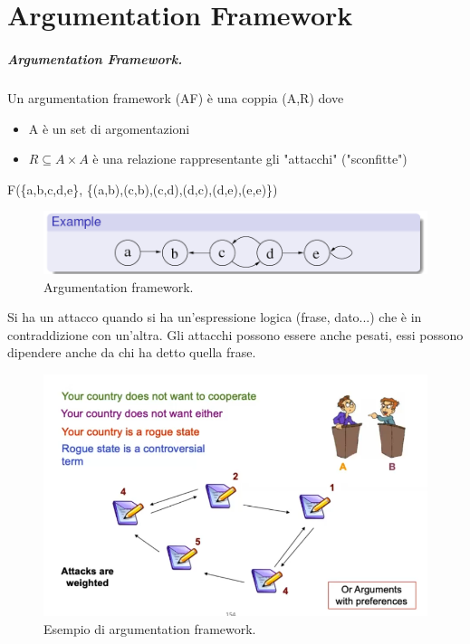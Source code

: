\chapter{Argumentation Framework}
\paragraph{Argumentation Framework.}Un argumentation framework (AF) è una coppia (A,R) dove 
\begin{itemize}
    \item A è un set di argomentazioni 
    \item $R \subseteq  A\times  A$ è una relazione rappresentante gli "attacchi" ("sconfitte")
\end{itemize}

\begin{center}
    F(\{a,b,c,d,e\}, \{(a,b),(c,b),(c,d),(d,c),(d,e),(e,e)\})
\end{center}
\begin{figure}[H]
    \centering
    \includegraphics[width=12cm, keepaspectratio]{img/arg_fram.png}
    \caption{Argumentation framework.}\label{fig:arg_fram}
\end{figure}
Si ha un attacco quando si ha un'espressione logica (frase, dato...) che è in contraddizione con un'altra. Gli attacchi possono essere anche pesati, essi possono dipendere anche da chi ha detto quella frase.
\begin{figure}[H]
    \centering
    \includegraphics[width=12cm, keepaspectratio]{img/es_arg_fram.png}
    \caption{Esempio di argumentation framework.}\label{fig:es_arg_fram}
\end{figure}
